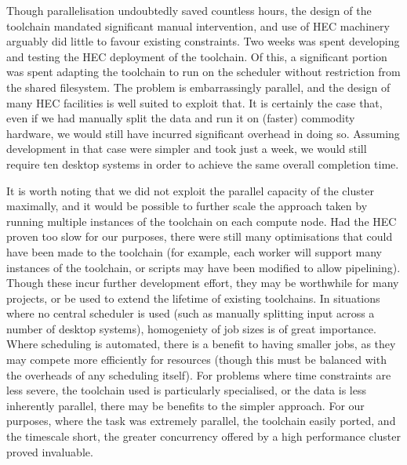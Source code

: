 
Though parallelisation undoubtedly saved countless hours, the design of the toolchain mandated significant manual intervention, and use of HEC machinery arguably did little to favour existing constraints.
Two weeks was spent developing and testing the HEC deployment of the toolchain.  Of this, a significant portion was spent adapting the toolchain to run on the scheduler without restriction from the shared filesystem.
The problem is embarrassingly parallel, and the design of many HEC facilities is well suited to exploit that.  It is certainly the case that, even if we had manually split the data and run it on (faster) commodity hardware, we would still have incurred significant overhead in doing so.  Assuming development in that case were simpler and took just a week, we would still require ten desktop systems in order to achieve the same overall completion time.  

It is worth noting that we did not exploit the parallel capacity of the cluster maximally, and it would be possible to further scale the approach taken by running multiple instances of the toolchain on each compute node. 
Had the HEC proven too slow for our purposes, there were still many optimisations that could have been made to the toolchain (for example, each worker will support many instances of the toolchain, or scripts may have been modified to allow pipelining).  Though these incur further development effort, they may be worthwhile for many projects, or be used to extend the lifetime of existing toolchains.
In situations where no central scheduler is used (such as manually splitting input across a number of desktop systems), homogeniety of job sizes is of great importance.  Where scheduling is automated, there is a benefit to having smaller jobs, as they may compete more efficiently for resources (though this must be balanced with the overheads of any scheduling itself).
For problems where time constraints are less severe, the toolchain used is particularly specialised, or the data is less inherently parallel, there may be benefits to the simpler approach.  For our purposes, where the task was extremely parallel, the toolchain easily ported, and the timescale short, the greater concurrency offered by a high performance cluster proved invaluable.  


